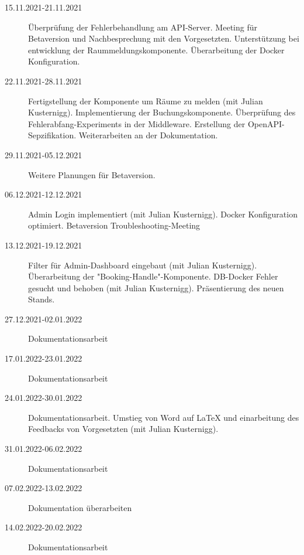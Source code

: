 \begin{description}
    \item[15.11.2021-21.11.2021] Überprüfung der Fehlerbehandlung am API-Server. Meeting für Betaversion und Nachbesprechung mit den Vorgesetzten. Unterstützung bei entwicklung der Raummeldungskomponente. Überarbeitung der Docker Konfiguration.
    \item[22.11.2021-28.11.2021] Fertigstellung der Komponente um Räume zu melden (mit Julian Kusternigg). Implementierung der Buchungskomponente. Überprüfung des Fehlerabfang-Experiments in der Middleware. Erstellung der OpenAPI-Sepzifikation. Weiterarbeiten an der Dokumentation.
    \item[29.11.2021-05.12.2021] Weitere Planungen für Betaversion.
    \item[06.12.2021-12.12.2021] Admin Login implementiert (mit Julian Kusternigg). Docker Konfiguration optimiert. Betaversion Troubleshooting-Meeting
    \item[13.12.2021-19.12.2021] Filter für Admin-Dashboard eingebaut (mit Julian Kusternigg). Überarbeitung der "Booking-Handle"-Komponente. DB-Docker Fehler gesucht und behoben (mit Julian Kusternigg). Präsentierung des neuen Stands.
    \item[27.12.2021-02.01.2022] Dokumentationsarbeit 
    \item[17.01.2022-23.01.2022] Dokumentationsarbeit
    \item[24.01.2022-30.01.2022] Dokumentationsarbeit. Umstieg von Word auf LaTeX und einarbeitung des Feedbacks von Vorgesetzten (mit Julian Kusternigg). 
    \item[31.01.2022-06.02.2022] Dokumentationsarbeit
    \item[07.02.2022-13.02.2022] Dokumentation überarbeiten
    \item[14.02.2022-20.02.2022] Dokumentationsarbeit
\end{description}